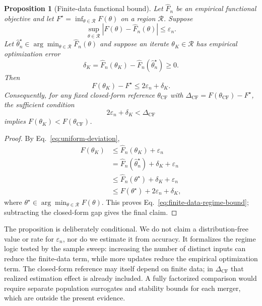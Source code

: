\documentclass[letterpaper]{article} %
\theoremstyle{plain}
\newtheorem{proposition}[theorem]{Proposition}
\theoremstyle{definition}
\begin{document}
\begin{proposition}[Finite-data functional bound]
\label{prop:finite-data-regime}
Let $\widehat F_n$ be an empirical functional objective and let $F^\star=\inf_{\theta\in\mathcal R}F(\theta)$ on a region $\mathcal R$.
Suppose
\begin{equation}
\sup_{\theta\in\mathcal R}|F(\theta)-\widehat F_n(\theta)|\le\varepsilon_n.
\label{eq:uniform-deviation}
\end{equation}
Let $\widehat\theta_n^\star\in\arg\min_{\theta\in\mathcal R}\widehat F_n(\theta)$ and suppose an iterate $\theta_K\in\mathcal R$ has empirical optimization error
\begin{equation}
\delta_K=
\widehat F_n(\theta_K)-\widehat F_n(\widehat\theta_n^\star)\ge0.
\label{eq:empirical-opt-error}
\end{equation}
Then
\begin{equation}
F(\theta_K)-F^\star\le 2\varepsilon_n+\delta_K.
\label{eq:finite-data-regime-bound}
\end{equation}
Consequently, for any fixed closed-form reference $\theta_{\mathrm{CF}}$ with $\Delta_{\mathrm{CF}}=F(\theta_{\mathrm{CF}})-F^\star$, the sufficient condition
\begin{equation}
2\varepsilon_n+\delta_K<\Delta_{\mathrm{CF}}
\label{eq:sufficient-regime-condition}
\end{equation}
implies $F(\theta_K)<F(\theta_{\mathrm{CF}})$.
\end{proposition}

\begin{proof}
By Eq.~\eqref{eq:uniform-deviation},
\begin{align*}
F(\theta_K)
&\le \widehat F_n(\theta_K)+\varepsilon_n \\
&=\widehat F_n(\widehat\theta_n^\star)+\delta_K+\varepsilon_n \\
&\le \widehat F_n(\theta^\star)+\delta_K+\varepsilon_n \\
&\le F(\theta^\star)+2\varepsilon_n+\delta_K,
\end{align*}
where $\theta^\star\in\arg\min_{\theta\in\mathcal R}F(\theta)$.
This proves Eq.~\eqref{eq:finite-data-regime-bound}; subtracting the closed-form gap gives the final claim.
\end{proof}

The proposition is deliberately conditional.
We do not claim a distribution-free value or rate for $\varepsilon_n$, nor do we estimate it from accuracy.
It formalizes the regime logic tested by the sample sweep: increasing the number of distinct inputs can reduce the finite-data term, while more updates reduce the empirical optimization term.
The closed-form reference may itself depend on finite data; in $\Delta_{\mathrm{CF}}$ that realized estimation effect is already included.
A fully factorized comparison would require separate population surrogates and stability bounds for each merger, which are outside the present evidence.
\end{document}
